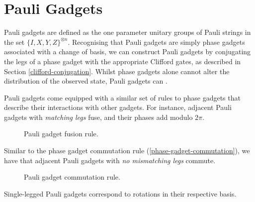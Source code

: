 \section{Pauli Gadgets}%
\label{pauli-gadgets-section}

Pauli gadgets are defined as the one parameter unitary groups of Pauli strings in the set $\{I, X, Y, Z\}^{\otimes n}$. Recognising that Pauli gadgets are simply phase gadgets associated with a change of basis, we can construct Pauli gadgets by conjugating the legs of a phase gadget with the appropriate Clifford gates, as described in Section \ref{clifford-conjugation}. Whilst phase gadgets alone cannot alter the distribution of the observed state, Pauli gadgets can \cite{Yeung2020}.


Pauli gadgets come equipped with a similar set of rules to phase gadgets that describe their interactions with other gadgets. For instance, adjacent Pauli gadgets with \textit{matching legs} fuse, and their phases add modulo $2\pi$.

\begin{figure}[H]
    \centering
    \caption{Pauli gadget fusion rule.}
    \label{pauli-gadget-fusion}
\end{figure}

Similar to the phase gadget commutation rule (\ref{phase-gadget-commutation}), we have that adjacent Pauli gadgets with \textit{no mismatching legs} commute.

\begin{figure}[H]
    \centering
    \caption{Pauli gadget commutation rule.}
    \label{pauli-gadget-commutation}
\end{figure}

Single-legged Pauli gadgets correspond to rotations in their respective basis.

\vspace{5pt}

